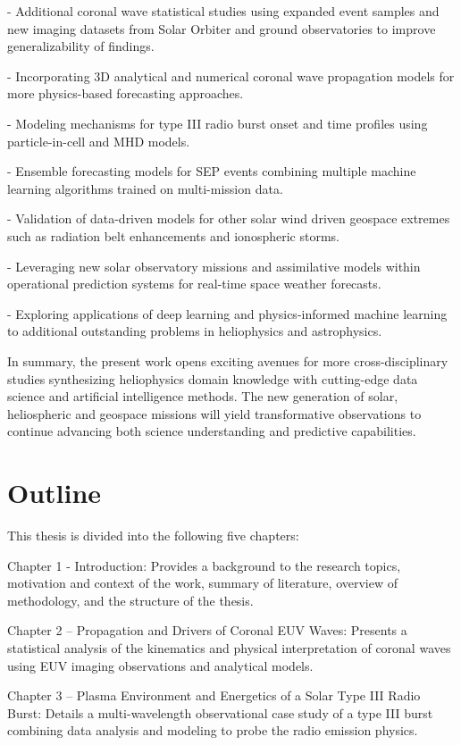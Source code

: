 - Additional coronal wave statistical studies using expanded event samples and new imaging datasets from Solar Orbiter and ground observatories to improve generalizability of findings.

- Incorporating 3D analytical and numerical coronal wave propagation models for more physics-based forecasting approaches. 

- Modeling mechanisms for type III radio burst onset and time profiles using particle-in-cell and MHD models. 

- Ensemble forecasting models for SEP events combining multiple machine learning algorithms trained on multi-mission data.

- Validation of data-driven models for other solar wind driven geospace extremes such as radiation belt enhancements and ionospheric storms.

- Leveraging new solar observatory missions and assimilative models within operational prediction systems for real-time space weather forecasts.

- Exploring applications of deep learning and physics-informed machine learning to additional outstanding problems in heliophysics and astrophysics.

In summary, the present work opens exciting avenues for more cross-disciplinary studies synthesizing heliophysics domain knowledge with cutting-edge data science and artificial intelligence methods. The new generation of solar, heliospheric and geospace missions will yield transformative observations to continue advancing both science understanding and predictive capabilities.


\section{Outline}
This thesis is divided into the following five chapters:

Chapter 1 - Introduction: Provides a background to the research topics, motivation and context of the work, summary of literature, overview of methodology, and the structure of the thesis. 

Chapter 2 – Propagation and Drivers of Coronal EUV Waves: Presents a statistical analysis of the kinematics and physical interpretation of coronal waves using EUV imaging observations and analytical models.

Chapter 3 – Plasma Environment and Energetics of a Solar Type III Radio Burst: Details a multi-wavelength observational case study of a type III burst combining data analysis and modeling to probe the radio emission physics. 

